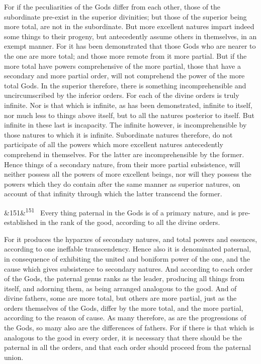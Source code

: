 \documentclass[12pt]{article}
\newcommand{\para}[1][]{\par\noindent\ifx&#1&\else\textsuperscript{\footnotesize #1}~\fi}
\begin{document}
For if the peculiarities of the Gods differ from each other, those of the subordinate pre-exist in the superior divinities; but those of the superior being more total, are not in the subordinate. But more excellent natures impart indeed some things to their progeny, but antecedently assume others in themselves, in an exempt manner. For it has been demonstrated that those Gods who are nearer to the one are more total; and those more remote from it more partial. But if the more total have powers comprehensive of the more partial, those that have a secondary and more partial order, will not comprehend the power of the more total Gods. In the superior therefore, there is something incomprehensible and uncircumscribed by the inferior orders. For each of the divine orders is truly infinite. Nor is that which is infinite, as has been demonstrated, infinite to itself, nor much less to things above itself, but to all the natures posterior to itself. But infinite in these last is incapacity. The infinite however, is incomprehensible by those natures to which it is infinite. Subordinate natures therefore, do not participate of all the powers which more excellent natures antecedently comprehend in themselves. For the latter are incomprehensible by the former. Hence things of a secondary nature, from their more partial subsistence, will neither possess all the powers of more excellent beings, nor will they possess the powers which they do contain after the same manner as superior natures, on account of that infinity through which the latter transcend the former.

\para[151] Every thing paternal in the Gods is of a primary nature, and is pre-established in the rank of the good, according to all the divine orders.

For it produces the hyparxes of secondary natures, and total powers and essences, according to one ineffable transcendency. Hence also it is denominated paternal, in consequence of exhibiting the united and boniform power of the one, and the cause which gives subsistence to secondary natures. And according to each order of the Gods, the paternal genus ranks as the leader, producing all things from itself, and adorning them, as being arranged analogous to the good. And of divine fathers, some are more total, but others are more partial, just as the orders themselves of the Gods, differ by the more total, and the more partial, according to the reason of cause. As many therefore, as are the progressions of the Gods, so many also are the differences of fathers. For if there is that which is analogous to the good in every order, it is necessary that there should be the paternal in all the orders, and that each order should proceed from the paternal union.
\end{document}
